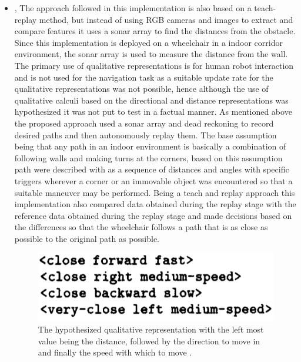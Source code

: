 \begin{itemize}
	\item \cite{musto1999qualitative}, The approach followed in this implementation is also based on a teach-replay method, but instead of using RGB cameras and images to extract and compare features it uses a sonar array to find the distances from the obstacle. Since this implementation is deployed on a wheelchair in a indoor corridor environment, the sonar array is used to measure the distance from the wall. The primary use of qualitative representations is for human robot interaction and is not used for the navigation task as a suitable update rate for the qualitative representations was not possible, hence although the use of qualitative calculi based on the directional and distance representations was hypothesized it was not put to test in a factual manner. As mentioned above the proposed approach used a sonar array and dead reckoning to record desired paths and then autonomously replay them. The base assumption being that any path in an indoor environment is basically a combination of following walls and making turns at the corners, based on this assumption path were described with as a sequence of distances and angles with specific triggers wherever a corner or an immovable object was encountered so that a suitable maneuver may be performed. Being a teach and replay approach this implementation also compared data obtained during the replay stage with the reference data obtained during the replay stage and made decisions based on the differences so that the wheelchair follows a path that is as close as possible to the original path as possible.
	\begin{figure}[h]
		\centering
		\includegraphics[scale=0.7]{images/musto}
		\caption{The hypothesized qualitative representation with the left most value being the distance, followed by the direction to move in and finally the speed with which to move \cite{musto1999qualitative}.}
		\label{fig:musto}
	\end{figure}
	
	

\end{itemize}
